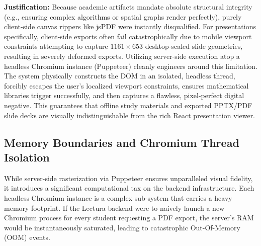 \begin{table}[htbp]
\centering
{}
\vspace{6pt}
\caption{Topological analysis of programmatic document export protocols.}
\label{tab:export_comparison}
\end{table}

\textbf{Justification:} Because academic artifacts mandate absolute structural integrity (e.g., ensuring complex algorithms or spatial graphs render perfectly), purely client-side canvas rippers like jsPDF were instantly disqualified. For presentations specifically, client-side exports often fail catastrophically due to mobile viewport constraints attempting to capture $1161 \times 653$ desktop-scaled slide geometries, resulting in severely deformed exports. Utilizing server-side execution atop a headless Chromium instance (Puppeteer) cleanly engineers around this limitation. The system physically constructs the DOM in an isolated, headless thread, forcibly escapes the user’s localized viewport constraints, ensures mathematical libraries trigger successfully, and then captures a flawless, pixel-perfect digital negative. This guarantees that offline study materials and exported PPTX/PDF slide decks are visually indistinguishable from the rich React presentation viewer.

\subsection{Memory Boundaries and Chromium Thread Isolation}
While server-side rasterization via Puppeteer ensures unparalleled visual fidelity, it introduces a significant computational tax on the backend infrastructure. Each headless Chromium instance is a complex sub-system that carries a heavy memory footprint. If the Lectura backend were to naively launch a new Chromium process for every student requesting a PDF export, the server’s RAM would be instantaneously saturated, leading to catastrophic Out-Of-Memory (OOM) events.

